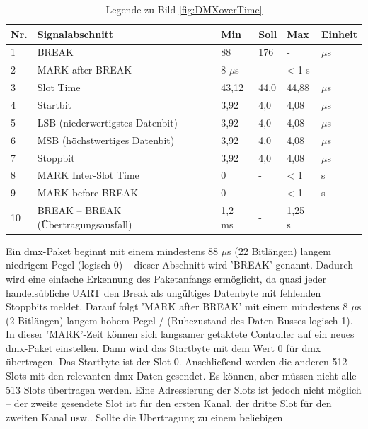 \documentclass[11pt]{scrartcl}
\begin{document}
\vspace{-.7cm}
\begin{table}[H]
    \small
    \begin{tabularx}{\textwidth}{|l|X|l|l|l|l|}
        \hline Nr. & Signalabschnitt & Min & Soll & Max & Einheit\\\hline
        1 & BREAK & 88 & 176 & - & $\mu$s\\\hline
        2 & MARK after BREAK & 8 $\mu$s & - & < 1 s & \\\hline
        3 & Slot Time & 43,12 & 44,0 & 44,88 & $\mu$s\\\hline
        4 & Startbit & 3,92 & 4,0 & 4,08 & $\mu$s\\\hline
        5 & LSB (niederwertigstes Datenbit) & 3,92 & 4,0 & 4,08 & $\mu$s\\\hline
        6 & MSB (höchstwertiges Datenbit) & 3,92 & 4,0 & 4,08 & $\mu$s\\\hline
        7 & Stoppbit & 3,92 & 4,0 & 4,08 & $\mu$s\\\hline
        8 & MARK Inter-Slot Time & 0 & - & < 1 & s\\\hline
        9 & MARK before BREAK & 0 & - & < 1 & s\\\hline
        10 & BREAK – BREAK (Übertragungsausfall) & 1,2 ms & - & 1,25 s & \\\hline
    \end{tabularx}
    \caption{Legende zu Bild \ref{fig:DMXoverTime}}
\end{table}
\vspace{-.1cm}
\noindent
Ein \ac{dmx}-Paket beginnt mit einem mindestens 88 $\mu$s (22 Bitlängen) langem niedrigem Pegel (logisch 0)
– dieser Abschnitt wird 'BREAK' genannt. Dadurch wird eine einfache Erkennung des Paketanfangs
ermöglicht, da quasi jeder handelsübliche UART den Break als ungültiges Datenbyte mit fehlenden
Stoppbits meldet. Darauf folgt 'MARK after BREAK' mit einem mindestens 8 $\mu$s (2 Bitlängen) langem hohem Pegel /
(Ruhezustand des Daten-Busses logisch 1). In dieser 'MARK'-Zeit können sich langsamer getaktete
Controller auf ein neues \ac{dmx}-Paket einstellen. Dann wird das Startbyte mit dem Wert 0 für \ac{dmx}
übertragen. Das Startbyte ist der Slot 0. Anschließend werden die anderen 512 Slots mit den
relevanten \ac{dmx}-Daten gesendet. Es können, aber müssen nicht alle 513 Slots übertragen werden.
Eine Adressierung der Slots ist jedoch nicht möglich – der zweite gesendete Slot ist für den ersten
Kanal, der dritte Slot für den zweiten Kanal usw.. Sollte die Übertragung zu einem beliebigen
\end{document}
